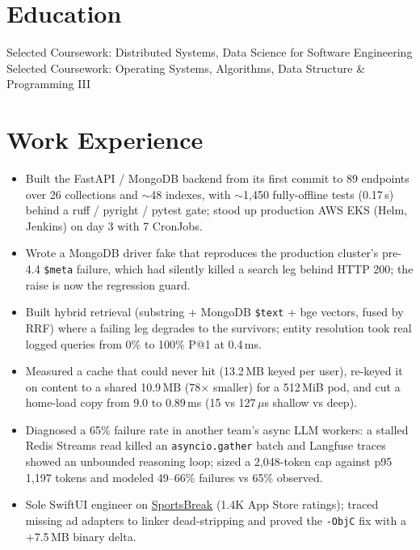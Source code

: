 \documentclass[11pt, letterpaper]{article}
\begin{document}

\section{Education}
Selected Coursework: Distributed Systems, Data Science for Software Engineering\\[1pt]
Selected Coursework: Operating Systems, Algorithms, Data Structure \& Programming III

\section{Work Experience}
\begin{itemize}
  \item Built the FastAPI / MongoDB backend from its first commit to 89 endpoints over 26 collections and $\sim$48 indexes, with $\sim$1{,}450 fully-offline tests (0.17\,s) behind a ruff / pyright / pytest gate; stood up production AWS EKS (Helm, Jenkins) on day 3 with 7 CronJobs.
  \item Wrote a MongoDB driver fake that reproduces the production cluster's pre-4.4 \texttt{\$meta} failure, which had silently killed a search leg behind HTTP 200; the raise is now the regression guard.
  \item Built hybrid retrieval (substring + MongoDB \texttt{\$text} + bge vectors, fused by RRF) where a failing leg degrades to the survivors; entity resolution took real logged queries from 0\% to 100\% P@1 at 0.4\,ms.
  \item Measured a cache that could never hit (13.2\,MB keyed per user), re-keyed it on content to a shared 10.9\,MB (78$\times$ smaller) for a 512\,MiB pod, and cut a home-load copy from 9.0 to 0.89\,ms (15 vs 127\,$\mu$s shallow vs deep).
  \item Diagnosed a 65\% failure rate in another team's async LLM workers: a stalled Redis Streams read killed an \texttt{asyncio.gather} batch and Langfuse traces showed an unbounded reasoning loop; sized a 2{,}048-token cap against p95 1{,}197 tokens and modeled 49--66\% failures vs 65\% observed.
  \item Sole SwiftUI engineer on \href{https://apps.apple.com/app/id6762649287}{SportsBreak} (1.4K App Store ratings); traced missing ad adapters to linker dead-stripping and proved the \texttt{-ObjC} fix with a +7.5\,MB binary delta.
\end{itemize}
\end{document}
